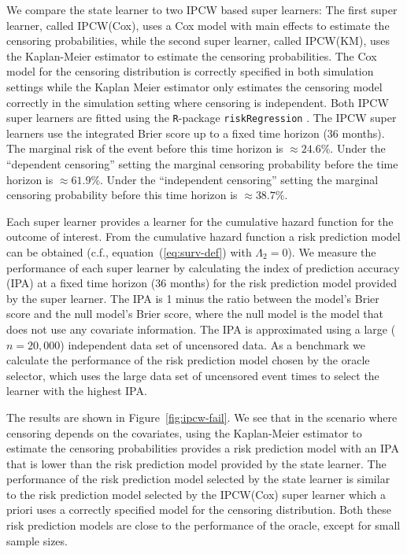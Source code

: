 \documentclass[numsec,webpdf,contemporary,medium,namedate]{oup-authoring-template}%
\theoremstyle{thmstyleone}%
\theoremstyle{thmstyletwo}%
\theoremstyle{thmstylethree}%
\newcommand{\1}{\mathds{1}}
\begin{document}
We compare the state learner to two IPCW based super learners: The
first super learner, called IPCW(Cox), uses a Cox model with main
effects to estimate the censoring probabilities, while the second
super learner, called IPCW(KM), uses the Kaplan-Meier estimator to
estimate the censoring probabilities. The Cox model for the censoring
distribution is correctly specified in both simulation settings while
the Kaplan Meier estimator only estimates the censoring model
correctly in the simulation setting where censoring is
independent. Both IPCW super learners are fitted using the
\texttt{R}-package \texttt{riskRegression}
\citep{Gerds_Ohlendorff_Ozenne_2023}.
%
%
The IPCW super learners use the integrated Brier score up to a fixed time
horizon (36 months). The marginal risk of the event before this time horizon is
\(\approx 24.6\)\%. Under the ``dependent censoring'' setting the marginal
censoring probability before the time horizon is \(\approx 61.9\)\%. Under the
``independent censoring'' setting the marginal censoring probability before this
time horizon is \( \approx 38.7 \)\%.

Each super learner provides a learner for the cumulative hazard
function for the outcome of interest. From the cumulative hazard
function a risk prediction model can be obtained (c.f.,
equation~(\ref{eq:surv-def}) with $\Lambda_2 = 0$). We measure the
performance of each super learner by calculating the index of
prediction accuracy (IPA) \citep{kattan2018index} at a fixed time
horizon (36 months) for the risk prediction model provided by the
super learner. The IPA is 1 minus the ratio between the model's Brier
score and the null model's Brier score, where the null model is the
model that does not use any covariate information. The IPA is
approximated using a large (\( n = 20,000 \)) independent data set of
uncensored data. As a benchmark we calculate the performance of the
risk prediction model chosen by the oracle selector, which uses the
large data set of uncensored event times to select the learner with
the highest IPA.

The results are shown in Figure~\ref{fig:ipcw-fail}. We see that in
the scenario where censoring depends on the covariates, using the
Kaplan-Meier estimator to estimate the censoring probabilities
provides a risk prediction model with an IPA that is lower than the
risk prediction model provided by the state learner. The performance
of the risk prediction model selected by the state learner is similar
to the risk prediction model selected by the IPCW(Cox) super learner
which a priori uses a correctly specified model for the censoring
distribution. Both these risk prediction models are close to the
performance of the oracle, except for small sample sizes.
\end{document}
